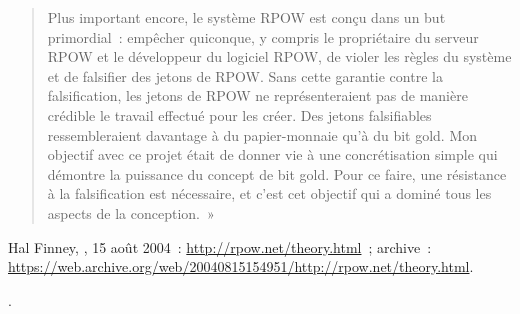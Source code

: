 {\begin{quote}
Plus important encore, le système RPOW est conçu dans un but primordial~: empêcher quiconque, y compris le propriétaire du serveur RPOW et le développeur du logiciel RPOW, de violer les règles du système et de falsifier des jetons de RPOW. Sans cette garantie contre la falsification, les jetons de RPOW ne représenteraient pas de manière crédible le travail effectué pour les créer. Des jetons falsifiables ressembleraient davantage à du papier-monnaie qu'à du bit gold. Mon objectif avec ce projet était de donner vie à une concrétisation simple qui démontre la puissance du concept de bit gold. Pour ce faire, une résistance à la falsification est nécessaire, et c'est cet objectif qui a dominé tous les aspects de la conception.~»
\end{quote}
Hal Finney, , 15 août 2004~: \url{http://rpow.net/theory.html}~; archive~: \url{https://web.archive.org/web/20040815154951/http://rpow.net/theory.html}.}. %
%
%

